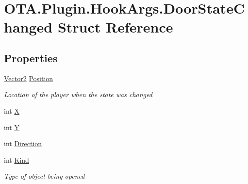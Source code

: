 \hypertarget{struct_o_t_a_1_1_plugin_1_1_hook_args_1_1_door_state_changed}{}\section{O\+T\+A.\+Plugin.\+Hook\+Args.\+Door\+State\+Changed Struct Reference}
\label{struct_o_t_a_1_1_plugin_1_1_hook_args_1_1_door_state_changed}
\subsection*{Properties}
\begin{DoxyCompactItemize}
\item 
\hyperlink{struct_microsoft_1_1_xna_1_1_framework_1_1_vector2}{Vector2} \hyperlink{struct_o_t_a_1_1_plugin_1_1_hook_args_1_1_door_state_changed_ae1f0cc937bc64ab8bb2d5248a9be6827}{Position}
\begin{DoxyCompactList}\small\item\em Location of the player when the state was changed \end{DoxyCompactList}\item 
int \hyperlink{struct_o_t_a_1_1_plugin_1_1_hook_args_1_1_door_state_changed_ae4eb7012a7fc1b76f7eb0db002da9523}{X}
\item 
int \hyperlink{struct_o_t_a_1_1_plugin_1_1_hook_args_1_1_door_state_changed_a958a9ab658ba0cb42f507c7d483d6213}{Y}
\item 
int \hyperlink{struct_o_t_a_1_1_plugin_1_1_hook_args_1_1_door_state_changed_a181ab000099db886256c60e6f09c98f6}{Direction}
\item 
int \hyperlink{struct_o_t_a_1_1_plugin_1_1_hook_args_1_1_door_state_changed_ac546b31e96a0534d7e973e42dc8087ba}{Kind}
\begin{DoxyCompactList}\small\item\em Type of object being opened \end{DoxyCompactList}\end{DoxyCompactItemize}


